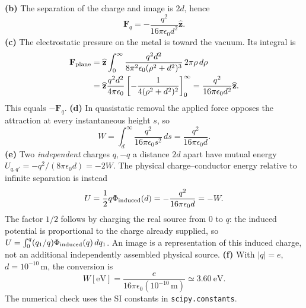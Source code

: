 \textbf{(b)} The separation of the charge and image is $2d$, hence
\[
\boxed{\mathbf F_q=-\frac{q^2}{16\pi\epsilon _0d^2}\widehat{\mathbf z}.}
\]
\textbf{(c)} The electrostatic pressure on the metal is toward the
vacuum. Its integral is
\begin{align*}
\mathbf F_{\rm plane}
&=\widehat{\mathbf z}\int_0^\infty
 \frac{q^2d^2}{8\pi^2\epsilon _0(\rho^2+d^2)^3}\,2\pi\rho\,d\rho\\
&=\widehat{\mathbf z}\frac{q^2d^2}{4\pi\epsilon _0}
 \left[-\frac1{4(\rho^2+d^2)^2}\right]_0^\infty
=\frac{q^2}{16\pi\epsilon _0d^2}\widehat{\mathbf z}.
\end{align*}
This equals $-\mathbf F_q$.
\textbf{(d)} In quasistatic removal the applied force opposes the
attraction at every instantaneous height $s$, so
\[
\boxed{W=\int_d^\infty\frac{q^2}{16\pi\epsilon _0s^2}\,ds
       =\frac{q^2}{16\pi\epsilon _0d}.}
\]
\textbf{(e)} Two \emph{independent} charges $q,-q$ a distance $2d$
apart have mutual energy $U_{q,q'}=-q^2/(8\pi\epsilon _0d)=-2W$.
The physical charge--conductor energy relative to infinite separation
is instead
\[
U=\frac12q\Phi_{\rm induced}(d)
 =-\frac{q^2}{16\pi\epsilon _0d}=-W.
\]
The factor $1/2$ follows by charging the real source from $0$ to $q$:
the induced potential is proportional to the charge already supplied,
so $U=\int_0^q(q_1/q)\Phi_{\rm induced}(q)\,dq_1$.
An image is a representation of this induced charge, not an additional
independently assembled physical source.
\textbf{(f)} With $|q|=e$, $d=10^{-10}\,\mathrm m$, the conversion is
\[
W[\mathrm{eV}]=\frac{e}{16\pi\epsilon _0(10^{-10}\,\mathrm m)}
\simeq\boxed{3.60\ \mathrm{eV}}.
\]
The numerical check uses the SI constants in \texttt{scipy.constants}.

